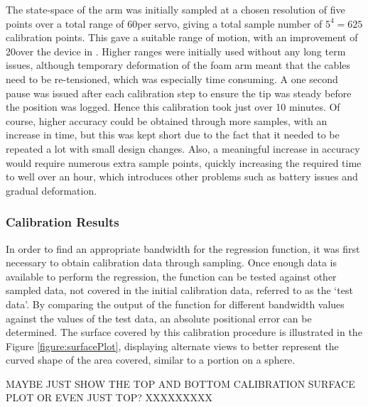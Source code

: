 \documentclass[11pt]{article}
\begin{document}
The state-space of the arm was initially sampled at a chosen resolution of five points over a total range of 60\degree per servo, giving a total sample number of $5^4 = 625$ calibration points. This gave a suitable range of motion, with an improvement of 20\degree over the device in \cite{GreggSmithDesign}. Higher ranges were initially used without any long term issues, although temporary deformation of the foam arm meant that the cables need to be re-tensioned, which was especially time consuming. A one second pause was issued after each calibration step to ensure the tip was steady before the position was logged. Hence this calibration took just over 10 minutes. Of course, higher accuracy could be obtained through more samples, with an increase in time, but this was kept short due to the fact that it needed to be repeated a lot with small design changes. Also, a meaningful increase in accuracy would require numerous extra sample points, quickly increasing the required time to well over an hour, which introduces other problems such as battery issues and gradual deformation.

\subsubsection{Calibration Results}
In order to find an appropriate bandwidth for the regression function, it was first necessary to obtain calibration data through sampling. Once enough data is available to perform the regression, the function can be tested against other sampled data, not covered in the initial calibration data, referred to as the `test data'. By comparing the output of the function for different bandwidth values against the values of the test data, an absolute positional error can be determined. The surface covered by this calibration procedure is illustrated in the Figure \ref{figure:surfacePlot}, displaying alternate views to better represent the curved shape of the area covered, similar to a portion on a sphere.



MAYBE JUST SHOW THE TOP AND BOTTOM CALIBRATION SURFACE PLOT OR EVEN JUST TOP? XXXXXXXXX
\end{document}

